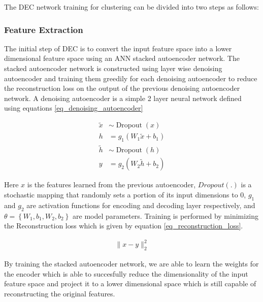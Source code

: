 \documentclass{article}
\begin{document}
The DEC network training for clustering can be divided into two steps as follows:

\subsubsection{Feature Extraction}
The initial step of DEC is to convert the input feature space into a lower dimensional feature space using an ANN stacked autoencoder network. The stacked autoencoder network is constructed using layer wise denoising autoencoder and training them greedily for each denoising autoencoder to reduce the reconstruction loss on the output of the previous denoising autoencoder network. A denoising autoencoder is a simple 2 layer neural network defined using equations \eqref{eq_denoising_autoencoder}

\begin{equation}
\begin{aligned} 
\tilde{x} & \sim \operatorname{Dropout}(x) \\ 
h &= g_{1}\left(W_{1} \tilde{x}+b_{1}\right) \\ 
\tilde{h} & \sim \operatorname{Dropout}(h) \\ 
y &=g_{2}\left(W_{2} \tilde{h}+b_{2}\right) 
\end{aligned}
\label{eq_denoising_autoencoder}
\end{equation}

Here $x$ is the features learned from the previous autoencoder, $Dropout(.)$ \cite{dropout} is a stochastic
mapping that randomly sets a portion of its input dimensions to 0, $g_1$ and $g_2$ are activation functions for encoding
and decoding layer respectively, and $\theta=\left\{W_{1}, b_{1}, W_{2}, b_{2}\right\}$
are model parameters. Training is performed by minimizing the Reconstruction loss which is given by equation \eqref{eq_reconstruction_loss}.

\begin{equation}
\begin{aligned} 
\|x-y\|_{2}^{2}
\end{aligned}
\label{eq_reconstruction_loss}
\end{equation}

By training the stacked autoencoder network, we are able to learn the weights for the encoder which is able to succesfully reduce the dimensionality of the input feature space and project it to a lower dimensional space which is still capable of reconstructing the original features.
\end{document}
